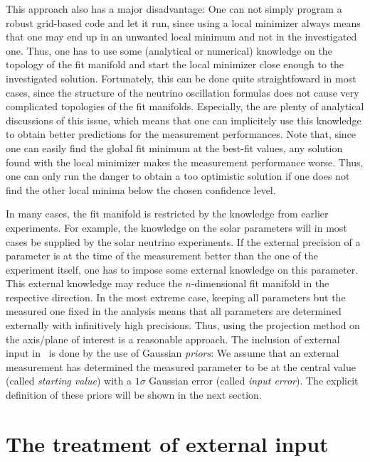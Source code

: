 This approach also has a major disadvantage: One can not simply program a robust grid-based code and let it run, since using a local minimizer always means that one may end up in an unwanted local minimum and not in the investigated one. Thus, one has to use some (analytical or numerical) knowledge on the topology of the fit manifold and start the local minimizer close enough to the investigated solution. Fortunately, this can be done quite straightfoward in most cases, since the structure of the neutrino oscillation formulas does not cause very complicated topologies of the fit manifolds. Especially, the are plenty of analytical discussions of this issue, which means that one can implicitely use this knowledge to obtain better predictions for the measurement performances. Note that, since one can easily find the global fit minimum at the best-fit values, any solution found with the local minimizer makes the measurement performance worse. Thus, one can only run the danger to obtain a too optimistic solution if one does not find the other local minima below the chosen confidence level.

  
In many cases, the fit manifold is restricted by the knowledge from earlier experiments. For example, the knowledge on the solar parameters will in most cases be supplied by the solar neutrino experiments. If the external precision of a parameter is at the time of the measurement better than the one of the experiment itself, one has to impose some external knowledge on this parameter. This external knowledge may reduce the $n$-dimensional fit manifold in the respective direction. In the most extreme case, keeping all parameters but the measured one fixed in the analysis means that all parameters are determined externally with infinitively high precisions. Thus, using the projection method on the axis/plane of interest is a reasonable approach. The inclusion of external input in \GLOBES\ is done by the use of Gaussian {\em priors}: We assume that an external measurement has determined the measured parameter to be at the central value (called {\em starting value}) with a $1 \sigma$ Gaussian error (called {\em input error}). The explicit definition of these priors will be shown in the next section.

\section{The treatment of external input}

